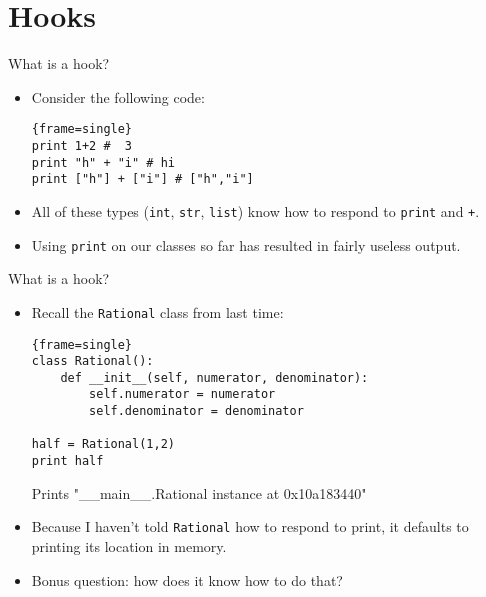 \documentclass{beamer}
\newcommand{\snippet}{\lstinline}
\begin{document}
\section{Hooks}
\begin{frame}[fragile]{What is a hook?}
	\begin{itemize}
	\item { Consider the following code:
  \begin{block}{}
\begin{lstlisting}{frame=single}
print 1+2 #  3 
print "h" + "i" # hi
print ["h"] + ["i"] # ["h","i"]
\end{lstlisting}
\end{block}
	}
	\pause
	\item {All of these types (\snippet{int}, \snippet{str}, \snippet{list}) know how to respond 
	to \snippet{print} and \snippet{+}.}
	\pause
	\item { Using \snippet{print} on our classes so far has resulted in fairly useless output.}
	\end{itemize}
\end{frame}
\begin{frame}[fragile]{What is a hook?}
	\begin{itemize}
	\item { Recall the \snippet{Rational} class from last time:
  \begin{block}{}
\begin{lstlisting}{frame=single}
class Rational():
    def __init__(self, numerator, denominator):
        self.numerator = numerator
        self.denominator = denominator

half = Rational(1,2)
print half 
\end{lstlisting}
\end{block}
	Prints "\_\_main\_\_.Rational instance at 0x10a183440"
	}
	\pause
	\item {Because I haven't told \snippet{Rational} how to respond to print, it defaults to printing 
	its location in memory.}
	\pause
	\item {Bonus question: how does it know how to do that?}
	\end{itemize}
\end{frame}
\end{document}
